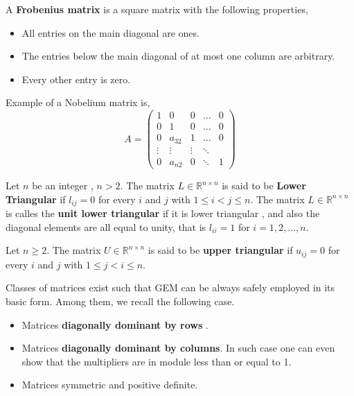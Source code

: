 \documentclass{article}
\theoremstyle{remark}
\begin{document}
\begin{definition}
   A \textbf{Frobenius matrix}  is a square matrix with the following properties,
   \begin{itemize}
     \item All entries on the main diagonal are ones.
     \item The entries below the main diagonal of at most one column are arbitrary.
     \item Every other entry is zero.
   \end{itemize}
 \end{definition}

 Example of a Nobelium matrix is,
 \[
   A = 
   \begin{pmatrix}
     1 & 0 & 0 & \ldots & 0 \\
     0 & 1 & 0 & \ldots & 0 \\
     0 & a_{32} & 1 & \ldots & 0 \\
     \vdots & \vdots & \vdots  & \ddots \\
     0  & a_{n 2}  & 0  & \ddots  &  1
   \end{pmatrix} 
 \] 

 \par


 \begin{definition}
   Let $n$ be an integer , $n> 2$. The matrix $L \in \mathbb{R}^{n\times n}$ is said to be \textbf{Lower Triangular} if $l_{ij} = 0$ for every $i$ and $j$ with $1 \le i < j \le n$. The matrix $L \in \mathbb{R}^{n\times n }$ is calles the \textbf{unit lower triangular }  if it is lower triangular , and also the diagonal elements are all equal to unity, that is $l_{ii} = 1$  for $i = 1,2, \ldots , n$.
   \par 
   Let $n\ge 2 $.  The matrix $U \in \mathbb{R}^{n\times n}$ is said to be \textbf{upper triangular }  if $ u_{ij} = 0$ for every $i$ and $j$ with $1 \le j < i \le n$.
 \end{definition}
 
 Classes of matrices exist such that GEM can be always safely employed in its basic form. Among them, we recall the following case. 
 \begin{itemize}
   \item Matrices \textbf{diagonally dominant by rows} .
   \item Matrices \textbf{diagonally dominant by columns}. In such case one can even show that the multipliers are in module less than or equal to 1.
   \item Matrices symmetric and positive definite. 
 \end{itemize}
\end{document}
